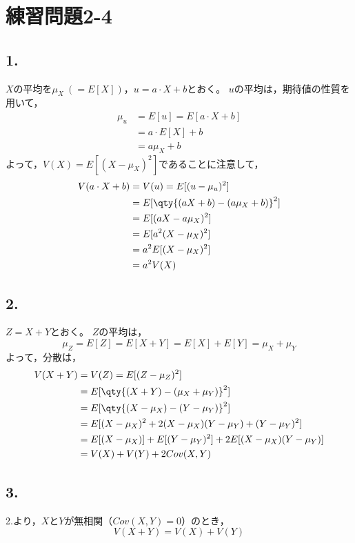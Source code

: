 \documentclass[class=jsarticle, crop=false, dvipdfmx, fleqn]{standalone}
\begin{document}
\section*{練習問題2-4}
\subsection*{1.}
\begin{comment}
\begin{equation}
V(a \cdot X + b) = a^2 \cdot V(X)
\end{equation}
を示す。
\end{comment}

$X$の平均を$\mu_X\ (= E[X])$，$u = a \cdot X + b$とおく。
$u$の平均は，期待値の性質を用いて，
\begin{equation}
\begin{split}
\mu_u & = E[u] = E[a \cdot X + b] \\
	& = a \cdot E[X] + b \\
	& = a \mu_X + b
\end{split}
\end{equation}
よって，$V(X) = E[(X - \mu_X)^2]$であることに注意して，
\begin{equation}
\begin{split}
V(a \cdot X + b) & = V(u) = E[(u - \mu_u)^2] \\
	& = E[\qty{(aX + b) - (a \mu_X+ b)}^2] \\
	& = E[(aX - a \mu_X)^2] \\
	& = E[a^2 (X - \mu_X)^2] \\
	& = a^2 E[(X - \mu_X)^2] \\
	& = a^2 V(X)
\end{split}
\end{equation}


\subsection*{2.}
$Z = X + Y$とおく。
$Z$の平均は，
\begin{equation}
\mu_Z = E[Z] = E[X + Y] = E[X] + E[Y] = \mu_X + \mu_Y
\end{equation}
よって，分散は，
\begin{equation}
\begin{split}
V(X + Y) & = V(Z) = E[(Z - \mu_Z)^2] \\
	& = E[\qty{(X + Y) - (\mu_X + \mu_Y)}^2]\\
	& = E[\qty{(X - \mu_X) - (Y - \mu_Y)}^2] \\
	& = E[(X - \mu_X)^2 + 2(X - \mu_X)(Y - \mu_Y) + (Y - \mu_Y)^2] \\
	& = E[(X - \mu_X)] + E[(Y - \mu_Y)^2] + 2E[(X - \mu_X)(Y - \mu_Y)] \\
	& = V(X) + V(Y) + 2Cov(X, Y)
\end{split}
\end{equation}


\subsection*{3.}
2.より，$X$と$Y$が無相関（$Cov(X, Y) = 0$）のとき，
\begin{equation}
V(X + Y) = V(X) + V(Y)
\end{equation}
\end{document}
